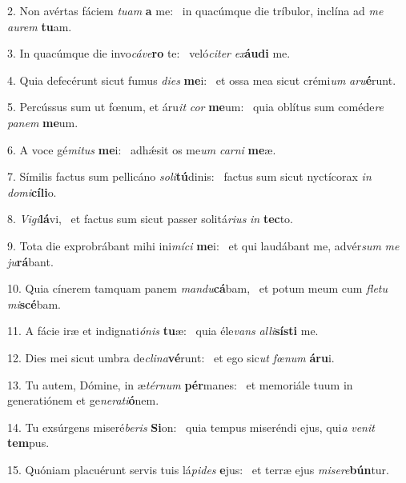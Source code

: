 2. Non avértas fáciem \textit{tu}\textit{am} \textbf{a} me: \ast\  in quacúmque die tríbulor, inclína ad \textit{me} \textit{au}\textit{rem} \textbf{tu}am.\

3. In quacúmque die invo\textit{cá}\textit{ve}\textbf{ro} te: \ast\  veló\textit{ci}\textit{ter} \textit{ex}\textbf{áu}\textbf{di} me.\

4. Quia defecérunt sicut fumus \textit{di}\textit{es} \textbf{me}i: \ast\  et ossa mea sicut crémi\textit{um} \textit{a}\textit{ru}\textbf{é}runt.\

5. Percússus sum ut fœnum, et áru\textit{it} \textit{cor} \textbf{me}um: \ast\  quia oblítus sum coméde\textit{re} \textit{pa}\textit{nem} \textbf{me}um.\

6. A voce gé\textit{mi}\textit{tus} \textbf{me}i: \ast\  adhǽsit os me\textit{um} \textit{car}\textit{ni} \textbf{me}æ.\

7. Símilis factus sum pellicáno \textit{so}\textit{li}\textbf{tú}dinis: \ast\  factus sum sicut nyctícorax \textit{in} \textit{do}\textit{mi}\textbf{cí}\textbf{li}o.\

8. \textit{Vi}\textit{gi}\textbf{lá}vi, \ast\  et factus sum sicut passer solitá\textit{ri}\textit{us} \textit{in} \textbf{tec}to.\

9. Tota die exprobrábant mihi ini\textit{mí}\textit{ci} \textbf{me}i: \ast\  et qui laudábant me, advér\textit{sum} \textit{me} \textit{ju}\textbf{rá}bant.\

10. Quia cínerem tamquam panem \textit{man}\textit{du}\textbf{cá}bam, \ast\  et potum meum cum \textit{fle}\textit{tu} \textit{mi}\textbf{scé}bam.\

11. A fácie iræ et indignati\textit{ó}\textit{nis} \textbf{tu}æ: \ast\  quia éle\textit{vans} \textit{al}\textit{li}\textbf{sís}\textbf{ti} me.\

12. Dies mei sicut umbra de\textit{cli}\textit{na}\textbf{vé}runt: \ast\  et ego sic\textit{ut} \textit{fœ}\textit{num} \textbf{á}\textbf{ru}i.\

13. Tu autem, Dómine, in æ\textit{tér}\textit{num} \textbf{pér}manes: \ast\  et memoriále tuum in generatiónem et ge\textit{ne}\textit{ra}\textit{ti}\textbf{ó}nem.\

14. Tu exsúrgens miseré\textit{be}\textit{ris} \textbf{Si}on: \ast\  quia tempus miseréndi ejus, qui\textit{a} \textit{ve}\textit{nit} \textbf{tem}pus.\

15. Quóniam placuérunt servis tuis lá\textit{pi}\textit{des} \textbf{e}jus: \ast\  et terræ ejus \textit{mi}\textit{se}\textit{re}\textbf{bún}tur.\

